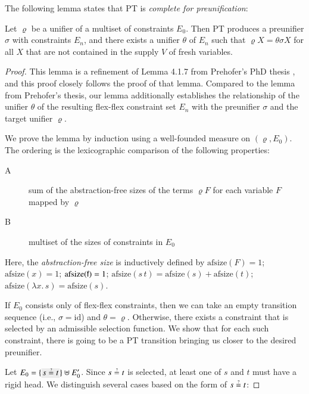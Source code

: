 The following lemma states that PT is \emph{complete for preunification}:
\begin{lemma}
  \label{unif:lemma:pt-complete}
  Let $\varrho$ be a unifier of a multiset of constraints $E_0$. Then PT produces a
  preunifier $\sigma$ with constraints $E_n$, and there exists a
  unifier $\theta$ of $E_n$ such that
  $\varrho X = \theta \sigma X$ for all $X$ that are not contained in the supply $V$ of fresh variables.
\end{lemma}
\begin{proof}
  This lemma is a refinement of Lemma 4.1.7 from Prehofer's PhD thesis
  \cite{cp-95-unifphd}, and this proof closely follows the proof of that lemma.
  Compared to the lemma from Prehofer's thesis, our lemma additionally establishes
  the relationship of the unifier $\theta$ of the resulting flex-flex constraint
  set $E_n$ with the preunifier $\sigma$ and the target unifier $\varrho$.

  We prove the lemma by induction 
  using a well-founded measure on $(\varrho,
  E_0)$. The ordering
  is the lexicographic comparison of the following properties:

  \begin{description}
    \item[A] sum of the abstraction-free sizes of the terms $\varrho F$ for each variable $F$ mapped by $\varrho$
    \item[B] multiset of the sizes of constraints in $E_0$
  \end{description}
Here, the \emph{abstraction-free size} is inductively defined by
$\text{afsize}(F) = 1$; $\text{afsize}(x) = 1$; $\text{afsize}(\mathsf{f})\allowbreak= 1$;
$\text{afsize}(s\,t) = \text{afsize}(s) + \text{afsize}(t)$;
$\text{afsize}(\lambda x.\, s) = \text{afsize}(s)$.

  If $E_0$ consists only of flex-flex constraints, then we can take an empty
  transition sequence (i.e., $\sigma = \text{id}$) and $\theta = \varrho$.
  Otherwise, there exists a constraint that is selected by an
  admissible selection function. We show that for each such constraint, there is
  going to be a PT transition bringing us closer to the desired preunifier.

  Let $E_0 = \{\selected{s \unif t}\} \uplus E'_0$. Since $s \unif t$ is selected, at least
  one of $s$ and $t$ must have a rigid head. We distinguish several cases based on the
  form of $s \unif t$:
  

\end{proof}
